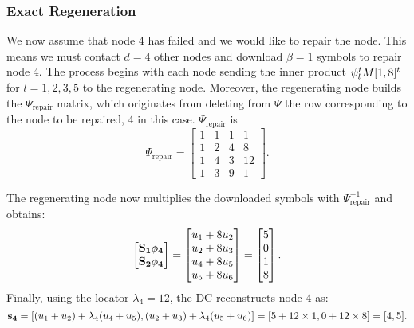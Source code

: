 \documentclass{article}
\begin{document}
\subsubsection{Exact Regeneration}
We now assume that node 4 has failed and we would like to repair the node. This means we must contact $d=4$ other nodes and download $\beta=1$ symbols to repair node 4. The process begins with each node sending the inner product $\vb{\psi}_{l}^t M[1,8]^t$ for $l = 1,2,3,5$ to the  regenerating node. Moreover, the  regenerating node builds the $\Psi_{\text{repair}}$ matrix, which originates from deleting from $\Psi$ the row corresponding to the node to be repaired, 4 in this case. $\Psi_{\text{repair}}$ is
\begin{equation*}
\Psi_{\text{repair}} =
\begin{bmatrix}
1 & 1 & 1 & 1 \\
1 & 2 & 4 & 8 \\
1 & 4 & 3 & 12 \\
1 & 3 & 9 & 1 
\end{bmatrix}.
\end{equation*}

The regenerating node now multiplies the downloaded symbols with $\Psi_{\text{repair}}^{-1}$ and obtains:
\begin{equation*}
\begin{bmatrix}
\vb{S_1}\vb{\phi_4}\\
\vb{S_2}\vb{\phi_4}\\
\end{bmatrix}
=
\begin{bmatrix}
u_1+8u_2 \\
u_2+8u_3 \\
u_4+8u_5 \\
u_5+8u_6 \\
\end{bmatrix}
=
\begin{bmatrix}
5 \\
0 \\
1 \\
8 \\
\end{bmatrix}.
\end{equation*}
Finally, using the locator $\lambda_4 = 12$, the DC reconstructs node 4 as:
\begin{equation*}
\vb{s_4} = [(u_1 + u_2)+\lambda_4(u_4 + u_5), (u_2 + u_3)+\lambda_4(u_5 + u_6)] = [5+12\times 1, 0 + 12\times 8] = [4, 5].
\end{equation*}
\end{document}

